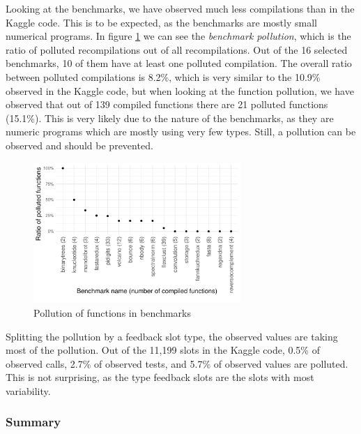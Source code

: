 Looking at the benchmarks, we have observed much less compilations than in the Kaggle code. This is to be expected, as the benchmarks are mostly small numerical programs. In figure \ref{fig:bench-pollution} we can see the \textit{benchmark pollution}, which is the ratio of polluted recompilations out of all recompilations. Out of the 16 selected benchmarks, 10 of them have at least one polluted compilation. The overall ratio between polluted compilations is 8.2\%, which is very similar to the 10.9\% observed in the Kaggle code, but when looking at the function pollution, we have observed that out of 139 compiled functions there are 21 polluted functions (15.1\%). This is very likely due to the nature of the benchmarks, as they are numeric programs which are mostly using very few types. Still, a pollution can be observed and should be prevented.

\begin{figure}
	\centering
	\includegraphics[width=0.7\textwidth]{figures/pollution/master/benchmark-pollutionBW.pdf}
	\caption{Pollution of functions in benchmarks\cite{feedback-vmil}}\label{fig:bench-pollution}
\end{figure}

Splitting the pollution by a feedback slot type, the observed values are taking most of the pollution. Out of the 11,199 slots in the Kaggle code, 0.5\% of observed calls, 2.7\% of observed tests, and 5.7\% of observed values are polluted. This is not surprising, as the type feedback slots are the slots with most variability.


\subsubsection*{Summary}

